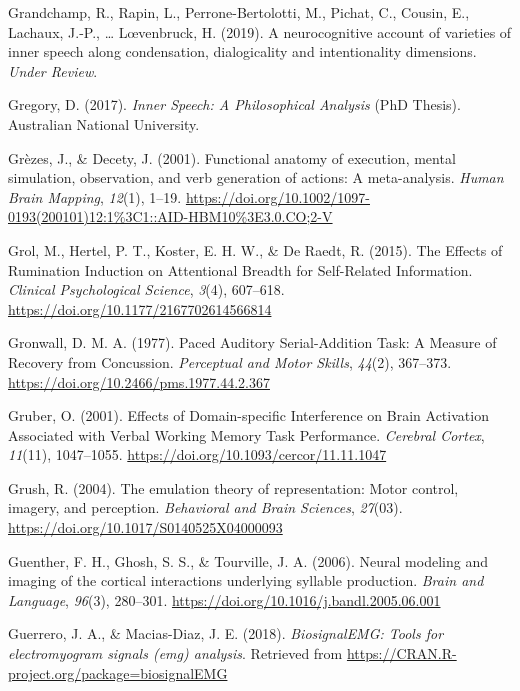 \documentclass[a4paper,12pt,twoside,openright,oldfontcommands]{memoir}
\begin{document}
\leavevmode\hypertarget{ref-grandchamp_neurocognitive_2019}{}%
Grandchamp, R., Rapin, L., Perrone-Bertolotti, M., Pichat, C., Cousin, E., Lachaux, J.-P., \ldots{} Lœvenbruck, H. (2019). A neurocognitive account of varieties of inner speech along condensation, dialogicality and intentionality dimensions. \emph{Under Review}.

\leavevmode\hypertarget{ref-gregory_inner_2017}{}%
Gregory, D. (2017). \emph{Inner Speech: A Philosophical Analysis} (PhD Thesis). Australian National University.

\leavevmode\hypertarget{ref-grezes_functional_2001}{}%
Grèzes, J., \& Decety, J. (2001). Functional anatomy of execution, mental simulation, observation, and verb generation of actions: A meta-analysis. \emph{Human Brain Mapping}, \emph{12}(1), 1--19. \url{https://doi.org/10.1002/1097-0193(200101)12:1\%3C1::AID-HBM10\%3E3.0.CO;2-V}

\leavevmode\hypertarget{ref-grol_effects_2015}{}%
Grol, M., Hertel, P. T., Koster, E. H. W., \& De Raedt, R. (2015). The Effects of Rumination Induction on Attentional Breadth for Self-Related Information. \emph{Clinical Psychological Science}, \emph{3}(4), 607--618. \url{https://doi.org/10.1177/2167702614566814}

\leavevmode\hypertarget{ref-gronwall_paced_1977}{}%
Gronwall, D. M. A. (1977). Paced Auditory Serial-Addition Task: A Measure of Recovery from Concussion. \emph{Perceptual and Motor Skills}, \emph{44}(2), 367--373. \url{https://doi.org/10.2466/pms.1977.44.2.367}

\leavevmode\hypertarget{ref-gruber_effects_2001}{}%
Gruber, O. (2001). Effects of Domain-specific Interference on Brain Activation Associated with Verbal Working Memory Task Performance. \emph{Cerebral Cortex}, \emph{11}(11), 1047--1055. \url{https://doi.org/10.1093/cercor/11.11.1047}

\leavevmode\hypertarget{ref-grush_emulation_2004}{}%
Grush, R. (2004). The emulation theory of representation: Motor control, imagery, and perception. \emph{Behavioral and Brain Sciences}, \emph{27}(03). \url{https://doi.org/10.1017/S0140525X04000093}

\leavevmode\hypertarget{ref-guenther_neural_2006}{}%
Guenther, F. H., Ghosh, S. S., \& Tourville, J. A. (2006). Neural modeling and imaging of the cortical interactions underlying syllable production. \emph{Brain and Language}, \emph{96}(3), 280--301. \url{https://doi.org/10.1016/j.bandl.2005.06.001}

\leavevmode\hypertarget{ref-R-biosignalEMG}{}%
Guerrero, J. A., \& Macias-Diaz, J. E. (2018). \emph{BiosignalEMG: Tools for electromyogram signals (emg) analysis}. Retrieved from \url{https://CRAN.R-project.org/package=biosignalEMG}
\end{document}
